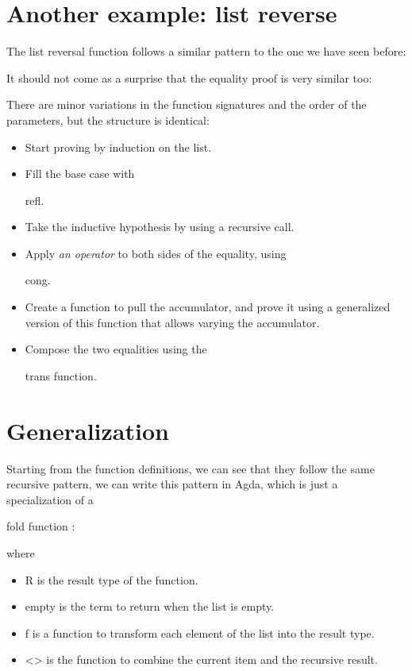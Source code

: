 \documentclass{cys}
\newcommand*{\SavedLstInline}{}
\DeclareRobustCommand*{\lstinline}{%
  \ifmmode
    \let\SavedBGroup\bgroup
    \def\bgroup{%
      \let\bgroup\SavedBGroup
      \hbox\bgroup
    }%
  \fi
  \SavedLstInline
  }
\begin{document}


\section{Another example: list reverse}

The list reversal function follows a similar pattern to the one we have seen before:



It should not come as a surprise that the equality proof is very similar too:



There are minor variations in the function signatures and the order of the parameters,
but the structure is identical:

\begin{itemize}
  \item Start proving by induction on the list.
  \item Fill the base case with \lstinline{refl}.
  \item Take the inductive hypothesis by using a recursive call.
  \item Apply \emph{an operator} to both sides of the equality, using \lstinline{cong}.
  \item Create a function to pull the accumulator, and prove it using a generalized
        version of this function that allows varying the accumulator.
  \item Compose the two equalities using the \lstinline{trans} function.
\end{itemize}

\section{Generalization}

Starting from the function definitions, we can see that they follow the same recursive
pattern, we can write this pattern in Agda, which is just a specialization of a
\lstinline{fold} function \cite{hutton1999tutorial,meijer1991functional}:



\noindent
where

\begin{itemize}
  \item \lstinline{R} is the result type of the function.
  \item \lstinline{empty} is the term to return when the list is empty.
  \item \lstinline{f} is a function to transform each element of the list into the result
        type.
  \item \lstinline{<>} is the function to combine the current item and the recursive
        result.
\end{itemize}
\end{document}
